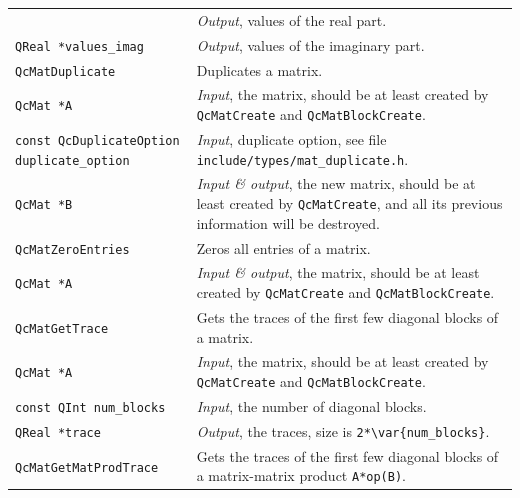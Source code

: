 \documentclass[a4paper,11pt,twoside,openright]{book}
\begin{document}
\begin{center}
\begin{longtable}{l|p{}}
      & \textsl{Output}, values of the real part.\\
    \hspace*{2ex}\verb|QReal *values_imag| %
      & \textsl{Output}, values of the imaginary part.\\
    \hline
%
    \verb|QcMatDuplicate|\index{\texttt{QcMatDuplicate}} %
      & Duplicates a matrix.\\
    \hspace*{2ex}\verb|QcMat *A| %
      & \textsl{Input}, the matrix, should be at least created by \verb|QcMatCreate|
        and \verb|QcMatBlockCreate|.\\
    \hspace*{2ex}\verb|const QcDuplicateOption duplicate_option| %
      & \textsl{Input}, duplicate option, see file
        \verb|include/types/mat_duplicate.h|.\\
    \hspace*{2ex}\verb|QcMat *B| %
      & \textsl{Input \& output}, the new matrix, should be at least created by
        \verb|QcMatCreate|, and all its previous information will be destroyed.\\
    \hline
%
    \verb|QcMatZeroEntries|\index{\texttt{QcMatZeroEntries}} %
      & Zeros all entries of a matrix.\\
    \hspace*{2ex}\verb|QcMat *A| %
      & \textsl{Input \& output}, the matrix, should be at least created by
        \verb|QcMatCreate| and \verb|QcMatBlockCreate|.\\
    \hline
%
    \verb|QcMatGetTrace|\index{\texttt{QcMatGetTrace}} %
      & Gets the traces of the first few diagonal blocks of a matrix.\\
    \hspace*{2ex}\verb|QcMat *A| %
      & \textsl{Input}, the matrix, should be at least created by
        \verb|QcMatCreate| and \verb|QcMatBlockCreate|.\\
    \hspace*{2ex}\verb|const QInt num_blocks| %
      & \textsl{Input}, the number of diagonal blocks.\\
    \hspace*{2ex}\verb|QReal *trace| %
      & \textsl{Output}, the traces, size is \verb|2*\var{num_blocks}|.\\
    \hline
%
    \verb|QcMatGetMatProdTrace|\index{\texttt{QcMatGetMatProdTrace}} %
      & Gets the traces of the first few diagonal blocks of a matrix-matrix
        product \verb|A*op(B)|.\\

\end{longtable}
\end{center}
\end{document}
